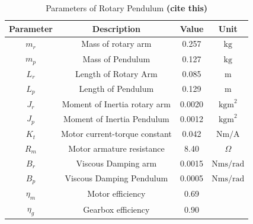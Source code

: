 \documentclass[superscriptaddress,floatfix,reprint,amssymb, amsmath,aps, pre]{revtex4-1}
\begin{document}
{{\begin{figure}[h!]
        \end{figure}
        \begin{table}[h!]
            \caption{Parameters of Rotary Pendulum \textbf{(cite this)} }
            \begin{tabular}{cccc}
                \hline Parameter & Description & Value & Unit \\
                \hline
                $m_{r}$ & Mass of rotary arm & 0.257 & $\mathrm{kg}$ \\
                $m_{p}$ & Mass of Pendulum & 0.127 & $\mathrm{kg}$ \\
                $L_{r}$ & Length of Rotary Arm & 0.085 & $\mathrm{m}$ \\
                $L_{p}$ & Length of Pendulum & 0.129 & $\mathrm{m}$ \\
                $J_{r}$ & Moment of Inertia rotary arm & 0.0020 & $\mathrm{kgm}^{2}$ \\
                $J_{p}$ & Moment of Inertia Pendulum & 0.0012 & $\mathrm{kgm}^{2}$ \\
                $K_{t}$ & Motor current-torque constant & 0.042 & $\mathrm{Nm} / \mathrm{A}$ \\
                $R_{m}$ & Motor armature resistance &8.40 & $\Omega$ \\
                $B_{r}$ & Viscous Damping arm & 0.0015 & $\mathrm{Nms} / \mathrm{rad}$ \\
                $B_{p}$ & Viscous Damping Pendulum & 0.0005 & $\mathrm{Nms} / \mathrm{rad}$ \\
                $\eta_m$ & Motor efficiency & 0.69 & \\
                $\eta_g$ & Gearbox efficiency & 0.90 & \\
                \hline
            \end{tabular}
            \label{tab:systemData}
        \end{table}
    }
}
\end{document}
